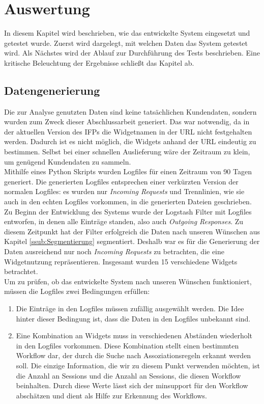 \section{Auswertung}
\label{sec:Auswertung}
In diesem Kapitel wird beschrieben, wie das entwickelte System eingesetzt und getestet wurde. Zuerst wird dargelegt, mit welchen Daten das System getestet wird. Als Nächstes wird der Ablauf zur Durchführung des Tests beschrieben. Eine kritische Beleuchtung der Ergebnisse schließt das Kapitel ab.
\subsection{Datengenerierung}
\label{sub:Datengenerierung}

Die zur Analyse genutzten Daten sind keine tatsächlichen Kundendaten, sondern wurden zum Zweck dieser Abschlussarbeit generiert. Das war notwendig, da in der aktuellen Version des IFPs die Widgetnamen in der URL nicht festgehalten werden. Dadurch ist es nicht möglich, die Widgets anhand der URL eindeutig zu bestimmen. Selbst bei einer schnellen Auslieferung wäre der Zeitraum zu klein, um genügend Kundendaten zu sammeln.\\
Mithilfe eines Python Skripts wurden Logfiles für einen Zeitraum von 90 Tagen generiert. Die generierten Logfiles entsprechen einer verkürzten Version der normalen Logfiles: es wurden nur \textit{Incoming Requests} und Trennlinien, wie sie auch in den echten Logfiles vorkommen, in die generierten Dateien geschrieben. Zu Beginn der Entwicklung des Systems wurde der Logstash Filter mit Logfiles entworfen, in denen alle Einträge standen, also auch \textit{Outgoing Responses}. Zu diesem Zeitpunkt hat der Filter erfolgreich die Daten nach unseren Wünschen aus Kapitel \ref{ssub:Segmentierung} segmentiert. Deshalb war es für die Generierung der Daten ausreichend nur noch \textit{Incoming Requests} zu betrachten, die eine Widgetnutzung repräsentieren. Insgesamt wurden 15 verschiedene Widgets betrachtet.\\
Um zu prüfen, ob das entwickelte System nach unseren Wünschen funktioniert, müssen die Logfiles zwei Bedingungen erfüllen:\\
\begin{enumerate}
	\item Die Einträge in den Logfiles müssen zufällig ausgewählt werden. Die Idee hinter dieser Bedingung ist, dass die Daten in den Logfiles unbekannt sind.\\
	\item Eine Kombination an Widgets muss in verschiedenen Abständen wiederholt in den Logfiles vorkommen. Diese Kombination stellt einen bestimmten Workflow dar, der durch die Suche nach Assoziationsregeln erkannt werden soll. Die einzige Information, die wir zu diesem Punkt verwenden möchten, ist die Anzahl an Sessions und die Anzahl an Sessions, die diesen Workflow beinhalten. Durch diese Werte lässt sich der minsupport für den Workflow abschätzen und dient als Hilfe zur Erkennung des Workflows.
\end{enumerate}
